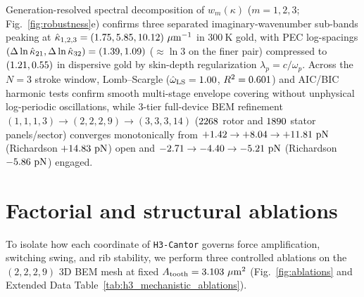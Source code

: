 \documentclass[pdflatex,sn-nature]{sn-jnl}
\begin{document}
Generation-resolved spectral decomposition of $w_m(\kappa)$ ($m=1,2,3$; Fig.~\ref{fig:robustness}e) confirms three separated imaginary-wavenumber sub-bands peaking at $\hat{\kappa}_{1,2,3} = (\HthreeSymGoldKoneDisp{}, \HthreeSymGoldKtwoDisp{}, \HthreeSymGoldKthreeDisp{})\ \mu\mathrm{m}^{-1}$ in $300\ \mathrm{K}$ gold, with PEC log-spacings $(\Delta\ln\hat{\kappa}_{21}, \Delta\ln\hat{\kappa}_{32}) = (1.39{}, 1.09{})$ ($\approx \ln 3$ on the finer pair) compressed to $(1.21{}, 0.55{})$ in dispersive gold by skin-depth regularization $\lambda_p = c/\omega_p$. Across the $N=3$ stroke window, Lomb--Scargle\cite{scargle1982} ($\hat{\omega}_{\mathrm{LS}} = 1.00{}$, $R^2 = 0.601{}$) and AIC/BIC harmonic tests confirm smooth multi-stage envelope covering without unphysical log-periodic oscillations, while 3-tier full-device BEM refinement $(1,1,1,3) \to (2,2,2,9) \to (3,3,3,14)$ ($2268{}$ rotor and $1890{}$ stator panels/sector) converges monotonically from $\HthreeMeshToneOpenDisp{} \to \HthreeMeshTtwoOpenDisp{} \to \HthreeMeshTthreeOpenDisp{}\ \mathrm{pN}$ (Richardson $+14.83{}\ \mathrm{pN}$) open and $\HthreeMeshToneEngDisp{} \to \HthreeMeshTtwoEngDisp{} \to \HthreeMeshTthreeEngDisp{}\ \mathrm{pN}$ (Richardson $-5.86{}\ \mathrm{pN}$) engaged.

\section*{Factorial and structural ablations}
\label{sec:ablations}

To isolate how each coordinate of \texttt{H3-Cantor} governs force amplification, switching swing, and rib stability, we perform three controlled ablations on the $(2,2,2,9)$ 3D BEM mesh at fixed $A_{\mathrm{tooth}} = 3.103{}\ \mu\mathrm{m}^2$ (Fig.~\ref{fig:ablations} and Extended Data Table~\ref{tab:h3_mechanistic_ablations}).
\end{document}
